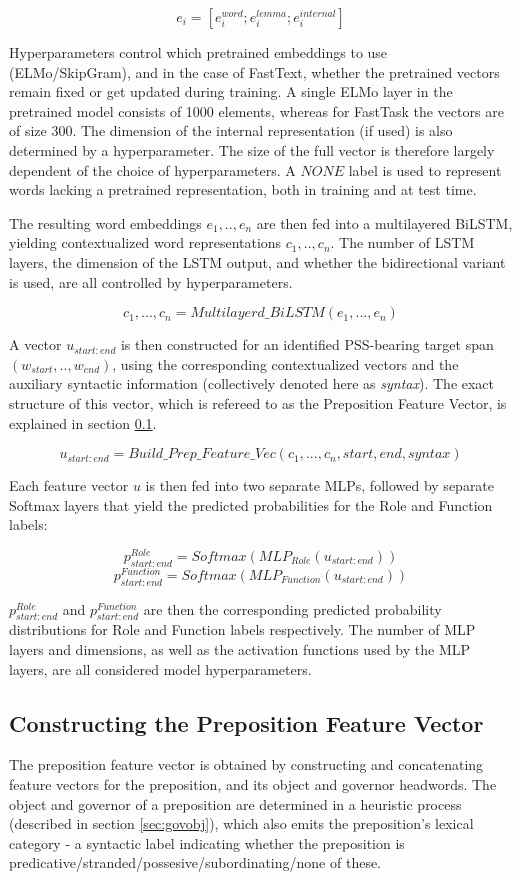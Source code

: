 $$ e_i = [e^{word}_i;e^{lemma}_i;e^{internal}_i] $$

Hyperparameters control which pretrained embeddings to use (ELMo/SkipGram), and in the case of FastText, whether the pretrained vectors remain fixed or get updated during training. A single ELMo layer in the pretrained model consists of 1000 elements, whereas for FastTask the vectors are of size 300. The dimension of the internal representation (if used) is also determined by a hyperparameter. The size of the full vector is therefore largely dependent of the choice of hyperparameters. A $NONE$ label is used to represent words lacking a pretrained representation, both in training and at test time.

The resulting word embeddings $e_1, .. ,e_n$ are then fed into a multilayered BiLSTM, yielding contextualized word representations $c_1, .. ,c_n$. The number of LSTM layers, the dimension of the LSTM output, and whether the bidirectional variant is used, are all controlled by hyperparameters.

$$ c_1, ... , c_n = Multilayerd\_BiLSTM(e_1, ... ,e_n)$$

A vector $u_{start:end}$ is then constructed for an identified PSS-bearing target span $(w_{start}, .., w_{end})$, using the corresponding contextualized vectors and the auxiliary syntactic information (collectively denoted here as \emph{syntax}). The exact structure of this vector, which is refereed to as the Preposition Feature Vector, is explained in section \ref{sec:enrichedvec}. 

$$u_{start:end} = Build\_Prep\_Feature\_Vec(c_1, ... ,c_n, start, end, syntax)$$

Each feature vector $u$ is then fed into two separate MLPs, followed by separate Softmax layers that
yield the predicted probabilities for the Role and
Function labels:

$$ p^{Role}_{start:end} = Softmax(MLP_{Role}(u_{start:end})) $$
$$ p^{Function}_{start:end} = Softmax(MLP_{Function}(u_{start:end})) $$

$p^{Role}_{start:end}$ and $p^{Function}_{start:end}$ are then the corresponding predicted probability distributions for Role and Function labels respectively. The number of MLP layers and dimensions, as well as the activation functions used by the MLP layers, are all considered model hyperparameters. 

\subsection{Constructing the Preposition Feature Vector} \label{sec:enrichedvec}
The preposition feature vector is obtained by constructing and concatenating feature vectors for the preposition, and its object and governor headwords. The object and governor of a preposition are determined in a heuristic process (described in section \ref{sec:govobj}), which also emits the preposition's lexical category - a syntactic label indicating whether the preposition is
predicative/stranded/possesive/subordinating/none of these. 


